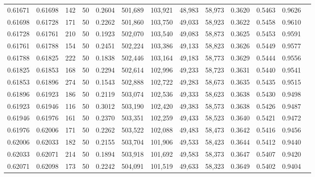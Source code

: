 \begin{tabular}{rrrrrrrrrrrrr}
0.61671 & 0.61698 &   142 &  50 &                                     0.2604 & 501,689 & 103,921 &  48,983 &  58,973 & 0.3620 & 0.5463 & 0.9626 \\
0.61698 & 0.61728 &   171 &  50 &                                     0.2262 & 501,860 & 103,750 &  49,033 &  58,923 & 0.3622 & 0.5458 & 0.9610 \\
0.61728 & 0.61761 &   210 &  50 &                                     0.1923 & 502,070 & 103,540 &  49,083 &  58,873 & 0.3625 & 0.5453 & 0.9591 \\
0.61761 & 0.61788 &   154 &  50 &                                     0.2451 & 502,224 & 103,386 &  49,133 &  58,823 & 0.3626 & 0.5449 & 0.9577 \\
0.61788 & 0.61825 &   222 &  50 &                                     0.1838 & 502,446 & 103,164 &  49,183 &  58,773 & 0.3629 & 0.5444 & 0.9556 \\
0.61825 & 0.61853 &   168 &  50 &                                     0.2294 & 502,614 & 102,996 &  49,233 &  58,723 & 0.3631 & 0.5440 & 0.9541 \\
0.61853 & 0.61896 &   274 &  50 &                                     0.1543 & 502,888 & 102,722 &  49,283 &  58,673 & 0.3635 & 0.5435 & 0.9515 \\
0.61896 & 0.61923 &   186 &  50 &                                     0.2119 & 503,074 & 102,536 &  49,333 &  58,623 & 0.3638 & 0.5430 & 0.9498 \\
0.61923 & 0.61946 &   116 &  50 &                                     0.3012 & 503,190 & 102,420 &  49,383 &  58,573 & 0.3638 & 0.5426 & 0.9487 \\
0.61946 & 0.61976 &   161 &  50 &                                     0.2370 & 503,351 & 102,259 &  49,433 &  58,523 & 0.3640 & 0.5421 & 0.9472 \\
0.61976 & 0.62006 &   171 &  50 &                                     0.2262 & 503,522 & 102,088 &  49,483 &  58,473 & 0.3642 & 0.5416 & 0.9456 \\
0.62006 & 0.62033 &   182 &  50 &                                     0.2155 & 503,704 & 101,906 &  49,533 &  58,423 & 0.3644 & 0.5412 & 0.9440 \\
0.62033 & 0.62071 &   214 &  50 &                                     0.1894 & 503,918 & 101,692 &  49,583 &  58,373 & 0.3647 & 0.5407 & 0.9420 \\
0.62071 & 0.62098 &   173 &  50 &                                     0.2242 & 504,091 & 101,519 &  49,633 &  58,323 & 0.3649 & 0.5402 & 0.9404 \\

\end{tabular}

